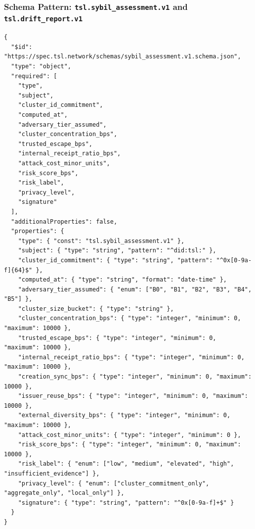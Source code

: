 \documentclass[11pt]{article}
\begin{document}
\subsubsection{Schema Pattern: \texttt{tsl.sybil\_assessment.v1} and \texttt{tsl.drift\_report.v1}}

\begin{lstlisting}[style=tslcode]
{
  "$id": "https://spec.tsl.network/schemas/sybil_assessment.v1.schema.json",
  "type": "object",
  "required": [
    "type",
    "subject",
    "cluster_id_commitment",
    "computed_at",
    "adversary_tier_assumed",
    "cluster_concentration_bps",
    "trusted_escape_bps",
    "internal_receipt_ratio_bps",
    "attack_cost_minor_units",
    "risk_score_bps",
    "risk_label",
    "privacy_level",
    "signature"
  ],
  "additionalProperties": false,
  "properties": {
    "type": { "const": "tsl.sybil_assessment.v1" },
    "subject": { "type": "string", "pattern": "^did:tsl:" },
    "cluster_id_commitment": { "type": "string", "pattern": "^0x[0-9a-f]{64}$" },
    "computed_at": { "type": "string", "format": "date-time" },
    "adversary_tier_assumed": { "enum": ["B0", "B1", "B2", "B3", "B4", "B5"] },
    "cluster_size_bucket": { "type": "string" },
    "cluster_concentration_bps": { "type": "integer", "minimum": 0, "maximum": 10000 },
    "trusted_escape_bps": { "type": "integer", "minimum": 0, "maximum": 10000 },
    "internal_receipt_ratio_bps": { "type": "integer", "minimum": 0, "maximum": 10000 },
    "creation_sync_bps": { "type": "integer", "minimum": 0, "maximum": 10000 },
    "issuer_reuse_bps": { "type": "integer", "minimum": 0, "maximum": 10000 },
    "external_diversity_bps": { "type": "integer", "minimum": 0, "maximum": 10000 },
    "attack_cost_minor_units": { "type": "integer", "minimum": 0 },
    "risk_score_bps": { "type": "integer", "minimum": 0, "maximum": 10000 },
    "risk_label": { "enum": ["low", "medium", "elevated", "high", "insufficient_evidence"] },
    "privacy_level": { "enum": ["cluster_commitment_only", "aggregate_only", "local_only"] },
    "signature": { "type": "string", "pattern": "^0x[0-9a-f]+$" }
  }
}


\end{lstlisting}
\end{document}
